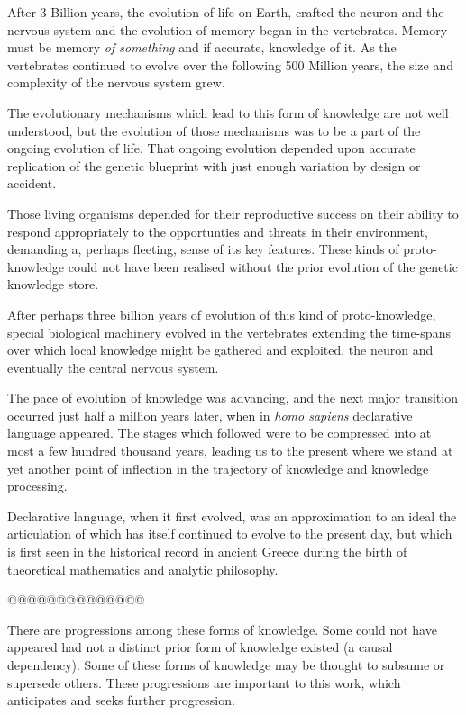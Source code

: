 \documentclass[10pt,titlepage]{book}
\begin{document}
After 3 Billion years, the evolution of life on Earth, crafted the neuron and the nervous system and the evolution of memory began in the vertebrates.
Memory must be memory \emph{of something} and if accurate, knowledge of it.
As the vertebrates continued to evolve over the following 500 Million years, the size and complexity of the nervous system grew.



The evolutionary mechanisms which lead to this form of knowledge are not well understood, but the evolution of those mechanisms was to be a part of the ongoing evolution of life.
That ongoing evolution depended upon accurate replication of the genetic blueprint with just enough variation by design or accident.

Those living organisms depended for their reproductive success on their ability to respond appropriately to the opportunties and threats in their environment, demanding a, perhaps fleeting, sense of its key features.
These kinds of proto-knowledge could not have been realised without the prior evolution of the genetic knowledge store.

After perhaps three billion years of evolution of this kind of proto-knowledge, special biological machinery evolved in the vertebrates extending the time-spans over which local knowledge might be gathered and exploited, the neuron and eventually the central nervous system.


The pace of evolution of knowledge was advancing, and the next major transition occurred just half a million years later, when in \emph{homo sapiens} declarative language appeared.
The stages which followed were to be compressed into at most a few hundred thousand years, leading us to the present where we stand at yet another point of inflection in the trajectory of knowledge and knowledge processing.

Declarative language, when it first evolved, was an approximation to an ideal the articulation of which has itself continued to evolve to the present day, but which is first seen in the historical record in ancient Greece during the birth of theoretical mathematics and analytic philosophy.


@@@@@@@@@@@@@@


There are progressions among these forms of knowledge.
Some could not have appeared had not a distinct prior form of knowledge existed (a causal dependency).
Some of these forms of knowledge may be thought to subsume or supersede others.
These progressions are important to this work, which anticipates and seeks further progression.
\end{document}
